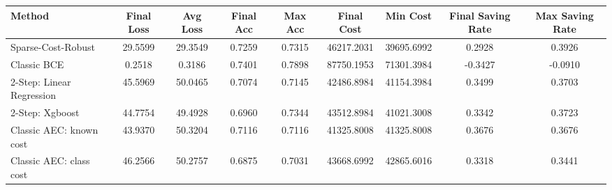 \begin{tabular}{lcccccccc}
\toprule
Method & Final Loss & Avg Loss & Final Acc & Max Acc & Final Cost & Min Cost & Final Saving Rate & Max Saving Rate \\
\midrule
Sparse-Cost-Robust & 29.5599 & 29.3549 & 0.7259 & 0.7315 & 46217.2031 & 39695.6992 & 0.2928 & 0.3926 \\
Classic BCE & 0.2518 & 0.3186 & 0.7401 & 0.7898 & 87750.1953 & 71301.3984 & -0.3427 & -0.0910 \\
2-Step: Linear Regression & 45.5969 & 50.0465 & 0.7074 & 0.7145 & 42486.8984 & 41154.3984 & 0.3499 & 0.3703 \\
2-Step: Xgboost & 44.7754 & 49.4928 & 0.6960 & 0.7344 & 43512.8984 & 41021.3008 & 0.3342 & 0.3723 \\
Classic AEC: known cost & 43.9370 & 50.3204 & 0.7116 & 0.7116 & 41325.8008 & 41325.8008 & 0.3676 & 0.3676 \\
Classic AEC: class cost & 46.2566 & 50.2757 & 0.6875 & 0.7031 & 43668.6992 & 42865.6016 & 0.3318 & 0.3441 \\
\bottomrule
\end{tabular}
